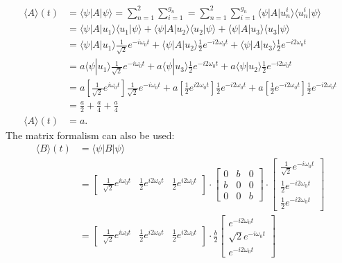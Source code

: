 \documentclass[letterpaper,11pt,twoside]{article}
\newcommand{\braket}[1]{\langle#1\rangle}
\begin{document}
\begin{enumerate}[itemsep=0pt,topsep=0pt,label=\alph*.]
\begin{align*}
    \braket{A}(t)&=\braket{\psi|A|\psi}=\sum_{n=1}^2\sum_{i=1}^{g_n}=\sum_{n=1}^2\sum_{i=1}^{g_n}\braket{\psi|A|u_n^i}\braket{u_n^i|\psi}\\
    &=\braket{\psi|A|u_1}\braket{u_1|\psi}+\braket{\psi|A|u_2}\braket{u_2|\psi}+\braket{\psi|A|u_3}\braket{u_3|\psi}\\
    &=\braket{\psi|A|u_1}\frac{1}{\sqrt{2}}e^{-i\omega_0t}+\braket{\psi|A|u_2}\frac{1}{2}e^{-i2\omega_0t}+\braket{\psi|A|u_3}\frac{1}{2}e^{-i2\omega_0t}\\
    &=a\braket{\psi|u_1}\frac{1}{\sqrt{2}}e^{-i\omega_0t}+a\braket{\psi|u_3}\frac{1}{2}e^{-i2\omega_0t}+a\braket{\psi|u_2}\frac{1}{2}e^{-i2\omega_0t}\\
    &=a\left[\frac{1}{\sqrt{2}}e^{i\omega_0t}\right]\frac{1}{\sqrt{2}}e^{-i\omega_0t}+a\left[\frac{1}{2}e^{i2\omega_0t}\right]\frac{1}{2}e^{-i2\omega_0t}+a\left[\frac{1}{2}e^{-i2\omega_0t}\right]\frac{1}{2}e^{-i2\omega_0t}\\
    &=\frac{a}{2}+\frac{a}{4}+\frac{a}{4}\\
    \braket{A}(t)&=a.
  \end{align*}
  The matrix formalism can also be used:
  \begin{align*}
    \braket{B}(t)&=\braket{\psi|B|\psi}\\
    &=\begin{bmatrix}
      \frac{1}{\sqrt{2}}e^{i\omega_0t}&\frac{1}{2}e^{i2\omega_0t}&\frac{1}{2}e^{i2\omega_0t}
    \end{bmatrix}\cdot\begin{bmatrix}
      0&b&0\\
      b&0&0\\
      0&0&b
    \end{bmatrix}\cdot\begin{bmatrix}
      \frac{1}{\sqrt{2}}e^{-i\omega_0t}\\\frac{1}{2}e^{-i2\omega_0t}\\\frac{1}{2}e^{-i2\omega_0t}
    \end{bmatrix}\\
    &=\begin{bmatrix}
      \frac{1}{\sqrt{2}}e^{i\omega_0t}&\frac{1}{2}e^{i2\omega_0t}&\frac{1}{2}e^{i2\omega_0t}
    \end{bmatrix}\cdot\frac{b}{2}\begin{bmatrix}
      e^{-i2\omega_0t}\\
      \sqrt{2}e^{-i\omega_0t}\\
      e^{-i2\omega_0t}
    \end{bmatrix}\\

\end{align*}
\end{enumerate}
\end{document}
